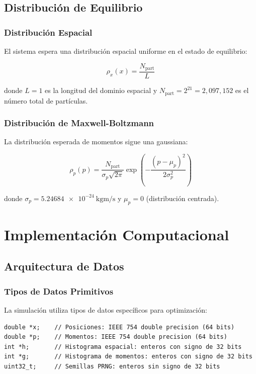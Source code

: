 \documentclass[12pt,a4paper]{article}
\begin{document}
\subsection{Distribución de Equilibrio}

\subsubsection{Distribución Espacial}

El sistema espera una distribución espacial uniforme en el estado de equilibrio:

\begin{equation}
\rho_x(x) = \frac{N_{\text{part}}}{L}
\end{equation}

donde $L = 1$ es la longitud del dominio espacial y $N_{\text{part}} = 2^{21} = 2,097,152$ es el número total de partículas.

\subsubsection{Distribución de Maxwell-Boltzmann}

La distribución esperada de momentos sigue una gaussiana:

\begin{equation}
\rho_p(p) = \frac{N_{\text{part}}}{\sigma_p \sqrt{2\pi}} \exp\left(-\frac{(p - \mu_p)^2}{2\sigma_p^2}\right)
\end{equation}

donde $\sigma_p = \SI{5.24684e-24}{\kilogram\meter\per\second}$ y $\mu_p = 0$ (distribución centrada).

\section{Implementación Computacional}

\subsection{Arquitectura de Datos}

\subsubsection{Tipos de Datos Primitivos}

La simulación utiliza tipos de datos específicos para optimización:

\begin{lstlisting}[caption=Tipos de datos principales]
double *x;    // Posiciones: IEEE 754 double precision (64 bits)
double *p;    // Momentos: IEEE 754 double precision (64 bits)
int *h;       // Histograma espacial: enteros con signo de 32 bits
int *g;       // Histograma de momentos: enteros con signo de 32 bits
uint32_t;     // Semillas PRNG: enteros sin signo de 32 bits
\end{lstlisting}
\end{document}
